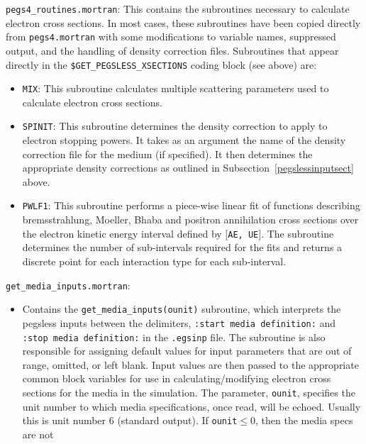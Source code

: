 \begin{description}
\begin{itemize}
\end{itemize}
\item{\tt pegs4\_routines.mortran}:  This contains the subroutines necessary to calculate electron cross sections.  In most
cases, these subroutines have been copied directly from {\tt pegs4.mortran} with some modifications to variable names, suppressed
output, and the handling of density correction files.  Subroutines that appear directly in the {\tt \$GET\_PEGSLESS\_XSECTIONS}
coding block (see above) are:
\begin{itemize}
\item {\tt MIX}: This subroutine calculates multiple scattering parameters used to calculate electron cross sections.
\item {\tt SPINIT}: This subroutine determines the density correction to apply to electron stopping powers.  It takes as
an argument the name of the density correction file for the medium (if specified).  It then determines the appropriate
density corrections as outlined in Subsection~\ref{pegslessinputsect} above.
\item {\tt PWLF1}: This subroutine performs a piece-wise linear fit of functions describing bremsstrahlung, Moeller, Bhaba
and positron annihilation cross sections over the electron kinetic energy interval defined by $[${\tt AE, UE}$]$.  The subroutine
determines the number of sub-intervals required for the fits and returns a discrete point for each interaction type for
each sub-interval.
\end{itemize}
\item {\tt get\_media\_inputs.mortran}:
\begin{itemize}
\item Contains the {\tt get\_media\_inputs(ounit)} subroutine, which interprets
the pegsless inputs between the delimiters, {\tt :start media definition:} and {\tt :stop media definition:}
in the {\tt .egsinp} file.  The subroutine is also responsible for assigning default values for input parameters
that are out of range, omitted, or left blank.  Input values are then passed to the appropriate common block
variables for use in calculating/modifying electron cross sections for the media in the simulation. The parameter,
{\tt ounit}, specifies the unit number to which media specifications, once read, will
be echoed.  Usually this is unit number 6 (standard output).  If {\tt ounit}$\leq$0, then the media specs are not

\end{itemize}
\end{description}
